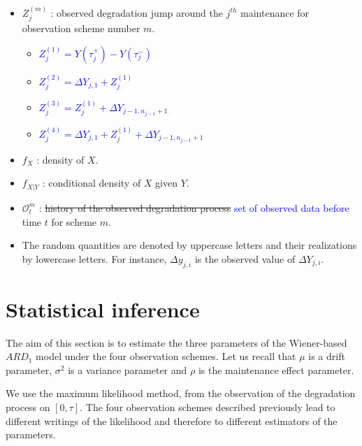 \begin{itemize}
\item $Z_j^{(m)}$ :  observed degradation jump around the $j^{th}$ maintenance for observation scheme number $m$.

\begin{itemize}[label=\textbullet]

\item \textcolor{blue}{$Z_j^{(1)}=Y(\tau_j^+)-Y(\tau_j^-)$ }

\item \textcolor{blue}{$Z_j^{(2)}=\Delta Y_{j,1}+Z_j^{(1)}$}

\item \textcolor{blue}{$Z_j^{(3)}=Z_j^{(1)}+\Delta Y_{j-1,n_{j-1}+1}$}

\item \textcolor{blue}{$Z_j^{(4)}=\Delta Y_{j,1}+Z_j^{(1)}+\Delta Y_{j-1,n_{j-1}+1}$ }
\end{itemize}


\item $f_X$ : density of $X$.

\item $f_{X|Y}$ : conditional density of $X$ given $Y$.

\item $\mathcal{O}^m_{t}$ :  \st{history of the observed degradation process} \textcolor{blue}{set of observed data before}  time $t$ for scheme $m$.

\item The random quantities are denoted by uppercase letters and their realizations by lowercase letters. For instance, $\Delta y_{j,i}$ is the observed value of $\Delta Y_{j,i}$.

\end{itemize}


\section{Statistical inference}
\label{section:stat}

The aim of this section is to estimate the three parameters of the Wiener-based  $ARD_1$ model under the four observation schemes. Let us recall that $\mu$ is a drift parameter, $\sigma^2$ is a variance parameter and $\rho$ is the maintenance effect parameter.

We use the maximum likelihood method, from the observation of the degradation process on $[0,\tau]$.
The four observation schemes described previously lead to different writings of the likelihood and therefore to different estimators of the parameters.

